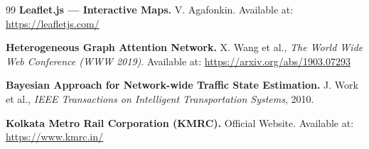 \documentclass[12pt, a4paper]{report}
\begin{document}
\begin{thebibliography}{99}
    \textbf{Leaflet.js — Interactive Maps.} V. Agafonkin.
    Available at: \url{https://leafletjs.com/}

    \textbf{Heterogeneous Graph Attention Network.}
    X. Wang et al., \textit{The World Wide Web Conference (WWW 2019)}.
    Available at: \url{https://arxiv.org/abs/1903.07293}

    \textbf{Bayesian Approach for Network-wide Traffic State Estimation.}
    J. Work et al., \textit{IEEE Transactions on Intelligent Transportation Systems}, 2010.

    \textbf{Kolkata Metro Rail Corporation (KMRC).} Official Website.
    Available at: \url{https://www.kmrc.in/}

\end{thebibliography}

\clearpage
\end{document}
